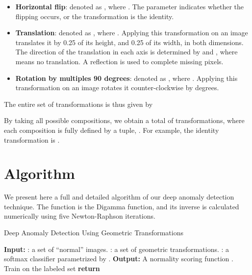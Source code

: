 \documentclass{article}
\begin{document}
\begin{itemize}
    \item \textbf{Horizontal flip}: denoted as , where . The parameter  indicates whether the flipping occurs, or the transformation is the identity.
\item \textbf{Translation}: denoted as , where . Applying this transformation on an image translates it by 0.25 of its height, and 0.25 of its width, in both dimensions. The direction of the translation in each axis is determined by  and , where  means no translation. A reflection is used to complete missing pixels. 
    \item \textbf{Rotation by multiples 90 degrees}: denoted as , where . Applying this transformation on an image rotates it counter-clockwise by  degrees.
\end{itemize}

The entire set of transformations is thus given by 

By taking all possible compositions, we obtain a total of  transformations,
where each composition is fully defined by a tuple, .
For example, the identity transformation is .

\section{Algorithm}
We present here a full and detailed algorithm of our deep anomaly detection technique. 
The function  is the Digamma function, and its inverse is calculated numerically using five Newton-Raphson iterations.

\begin{algorithm}[H]
\caption{Deep Anomaly Detection Using Geometric Transformations}\label{alg:anomaly_trans}
\begin{algorithmic}[1]
\Statex \textbf{Input:} : a set of ``normal'' images. : a set of geometric transformations. : a softmax classifier parametrized by .
\Statex \textbf{Output:} A normality scoring function .
\State 
{}
    \State Train  on the labeled set 
\EndWhile
\State{}
\For {}
    \State{}
    \State{}
    \State{}
    \State{ } 
        \State{} 
    \EndWhile
\EndFor
\State \textbf{return}  
\EndProcedure
\end{algorithmic}
\end{algorithm}
\end{document}

